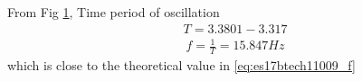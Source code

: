 \begin{enumerate}[label=\arabic*.,ref=\theenumi]
\begin{figure}[!ht]
\caption{}
\label{fig:es17btech11009_spice1}
\end{figure}
From Fig \ref{fig:es17btech11009_spice1},
Time period of oscillation 
\begin{align}
    T = 3.3801 - 3.317
\end{align}
\begin{align}
    f = \frac{1}{T} = 15.847 Hz
\end{align}
%
which is close to the theoretical value in \eqref{eq:es17btech11009_f}
%
\end{enumerate}
